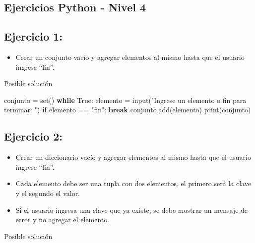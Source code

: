 \documentclass[
  a4paper,
  DIV=11,
  numbers=noendperiod,
  onepage,
  openany]{scrreprt}
\newenvironment{Shaded}{\begin{snugshade}}{\end{snugshade}}
\newcommand{\BuiltInTok}[1]{\textcolor[rgb]{0.00,0.23,0.31}{#1}}
\newcommand{\ControlFlowTok}[1]{\textcolor[rgb]{0.00,0.23,0.31}{\textbf{#1}}}
\newcommand{\NormalTok}[1]{\textcolor[rgb]{0.00,0.23,0.31}{#1}}
\newcommand{\OperatorTok}[1]{\textcolor[rgb]{0.37,0.37,0.37}{#1}}
\newcommand{\StringTok}[1]{\textcolor[rgb]{0.13,0.47,0.30}{#1}}
\newcommand{\VariableTok}[1]{\textcolor[rgb]{0.07,0.07,0.07}{#1}}
\providecommand{\tightlist}{%
  \setlength{\itemsep}{0pt}\setlength{\parskip}{0pt}}\usepackage{longtable,booktabs,array}
\begin{document}
\begin{tcolorbox}
\chapter{Ejercicios Python - Nivel 4}\label{ejercicios-python---nivel-4}

\section{Ejercicio 1:}\label{ejercicio-1-5}

\begin{itemize}
\tightlist
\item
  Crear un conjunto vacío y agregar elementos al mismo hasta que el
  usuario ingrese ``fin''.
\end{itemize}

Posible solución

\begin{Shaded}
\begin{Highlighting}[]
\NormalTok{conjunto }\OperatorTok{=} \BuiltInTok{set}\NormalTok{()}
\ControlFlowTok{while} \VariableTok{True}\NormalTok{:}
\NormalTok{    elemento }\OperatorTok{=} \BuiltInTok{input}\NormalTok{(}\StringTok{"Ingrese un elemento o \textquotesingle{}fin\textquotesingle{} para terminar: "}\NormalTok{)}
    \ControlFlowTok{if}\NormalTok{ elemento }\OperatorTok{==} \StringTok{"fin"}\NormalTok{:}
        \ControlFlowTok{break}
\NormalTok{    conjunto.add(elemento)}
\BuiltInTok{print}\NormalTok{(conjunto)}
\end{Highlighting}
\end{Shaded}

\section{Ejercicio 2:}\label{ejercicio-2-4}

\begin{itemize}
\tightlist
\item
  Crear un diccionario vacío y agregar elementos al mismo hasta que el
  usuario ingrese ``fin''.
\item
  Cada elemento debe ser una tupla con dos elementos, el primero será la
  clave y el segundo el valor.
\item
  Si el usuario ingresa una clave que ya existe, se debe mostrar un
  mensaje de error y no agregar el elemento.
\end{itemize}

Posible solución


\end{tcolorbox}
\end{document}
